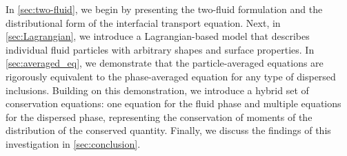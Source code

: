In \ref{sec:two-fluid}, we begin by presenting the two-fluid formulation and the distributional form of the interfacial transport equation. 
Next, in \ref{sec:Lagrangian}, we introduce a Lagrangian-based model that describes individual fluid particles with arbitrary shapes and surface properties. 
In \ref{sec:averaged_eq}, we demonstrate that the particle-averaged equations are rigorously equivalent to the phase-averaged equation for any type of dispersed inclusions. 
Building on this demonstration, we introduce a hybrid set of conservation equations: one equation for the fluid phase and multiple equations for the dispersed phase, representing the conservation of moments of the distribution of the conserved quantity. 
Finally, we discuss the findings of this investigation in \ref{sec:conclusion}.



